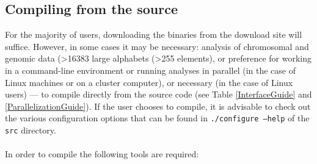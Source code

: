 \subsection{Compiling from the source}
\label{Compilingfromsource}

For the majority of users, downloading the binaries from the \poy
download site will suffice.  However, in some cases it may be %
necessary: analysis of chromosomal and genomic data (\textgreater16383
large alphabets (\textgreater255 elements), or%
preference for working in a command-line environment or running
\poy analyses in parallel (in the case of Linux machines or on a
cluster computer), or necessary (in the case of Linux users) ---
to compile \poy directly from the source code (see Table
\ref{InterfaceGuide} and \ref{ParallelizationGuide}).  If the user
chooses to compile, it is advisable to check out the various
configuration options that can be found in {\tt ./configure --help}
of the \texttt {src} directory. \\ \\ In order to compile \poy the
following tools are required:

